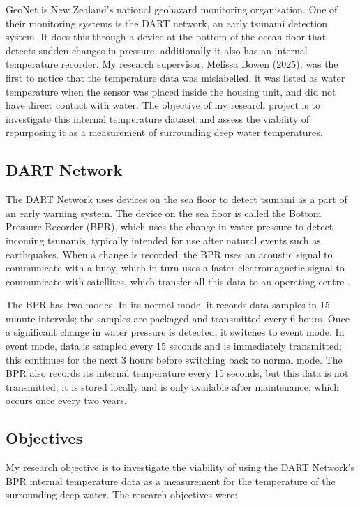 \documentclass[12pt,a4paper]{article}
\begin{document}
GeoNet is New Zealand's national geohazard monitoring organisation. One of
their monitoring systems is the DART network, an early tsunami detection
system. It does this through a device at the bottom of the ocean floor that
detects sudden changes in pressure, additionally it also has an internal
temperature recorder. My research supervisor, Melissa Bowen (2025), was the first
to notice that the temperature data was mislabelled, it was listed as water
temperature when the sensor was placed inside the housing unit, and did not
have direct contact with water. The objective of my research project is to
investigate this internal temperature dataset and assess the viability of
repurposing it as a measurement of surrounding deep water temperatures.

\subsection{DART Network}

The DART Network uses devices on the sea floor to detect tsunami as a part of
an early warning system. The device on the sea floor is called the Bottom
Pressure Recorder (BPR), which uses the change in water pressure to detect
incoming tsunamis, typically intended for use after natural events such as
earthquakes. When a change is recorded, the BPR uses an acoustic signal to
communicate with a buoy, which in turn uses a faster electromagnetic signal to
communicate with satellites, which transfer all this data to an operating
centre \citep{geonet}.

The BPR has two modes. In its normal mode, it records data samples in
15 minute intervals; the samples are packaged and transmitted every 6 hours.
Once a significant change in water pressure is detected, it switches to event
mode. In event mode, data is sampled every 15 seconds and is immediately
transmitted; this continues for the next 3 hours before switching back to
normal mode. The BPR also records its internal temperature every 15 seconds,
but this data is not transmitted; it is stored locally and is only available
after maintenance, which occurs once every two years.

\newpage %

\subsection{Objectives}

My research objective is to investigate the viability of using the DART
Network's BPR internal temperature data as a measurement for the temperature
of the surrounding deep water. The research objectives were:
\end{document}
